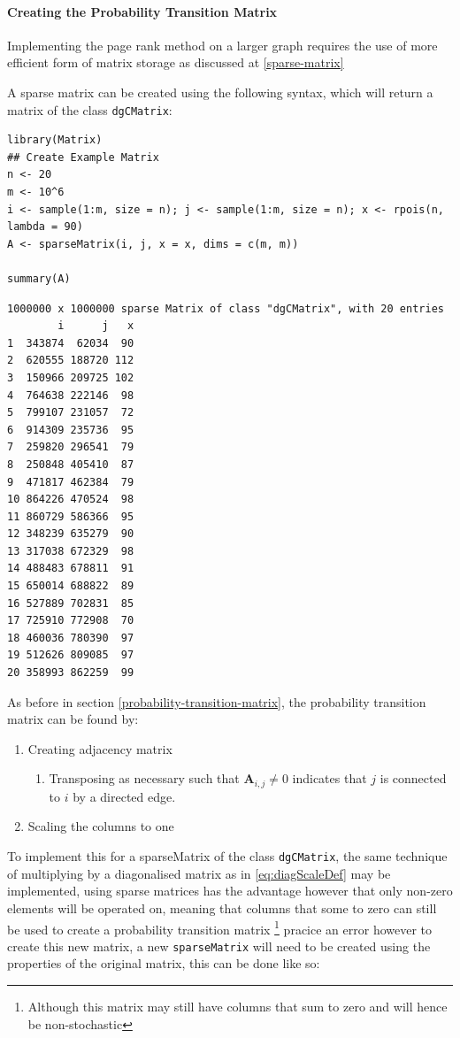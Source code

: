 \documentclass[11pt]{article}
\begin{document}
\paragraph{Creating the Probability Transition Matrix}
\label{sec:org0c78411}
Implementing the page rank method on a larger graph requires the use of more
efficient form of matrix storage as discussed at \ref{sparse-matrix}

A sparse matrix can be created using the following syntax, which will return a
matrix of the class \texttt{dgCMatrix}:

\lstset{language=r,label= ,caption= ,captionpos=b,numbers=none}
\begin{lstlisting}
library(Matrix)
## Create Example Matrix
n <- 20
m <- 10^6
i <- sample(1:m, size = n); j <- sample(1:m, size = n); x <- rpois(n, lambda = 90)
A <- sparseMatrix(i, j, x = x, dims = c(m, m))

summary(A)
\end{lstlisting}

\begin{verbatim}
1000000 x 1000000 sparse Matrix of class "dgCMatrix", with 20 entries
        i      j   x
1  343874  62034  90
2  620555 188720 112
3  150966 209725 102
4  764638 222146  98
5  799107 231057  72
6  914309 235736  95
7  259820 296541  79
8  250848 405410  87
9  471817 462384  79
10 864226 470524  98
11 860729 586366  95
12 348239 635279  90
13 317038 672329  98
14 488483 678811  91
15 650014 688822  89
16 527889 702831  85
17 725910 772908  70
18 460036 780390  97
19 512626 809085  97
20 358993 862259  99
\end{verbatim}

As before in section \ref{probability-transition-matrix}, the probability transition matrix can be found by:

\begin{enumerate}
\item Creating adjacency matrix
\begin{enumerate}
\item Transposing as necessary such that \(\mathbf{A}_{i,j}\neq 0\) indicates that \(j\) is connected to \(i\) by a directed edge.
\end{enumerate}
\item Scaling the columns to one
\end{enumerate}

To implement this for a sparseMatrix of the class \texttt{dgCMatrix}, the same
technique of multiplying by a diagonalised matrix as in \eqref{eq:diagScaleDef} may be
implemented, using sparse matrices has the advantage however that only non-zero
elements will be operated on, meaning that columns that some to zero can still
be used to create a probability transition matrix \footnote{Although this matrix may
still have columns that sum to zero and will hence be non-stochastic}
pracice an error however to create this new matrix, a new \texttt{sparseMatrix} will
need to be created using the properties of the original matrix, this can be done
like so:
\end{document}
